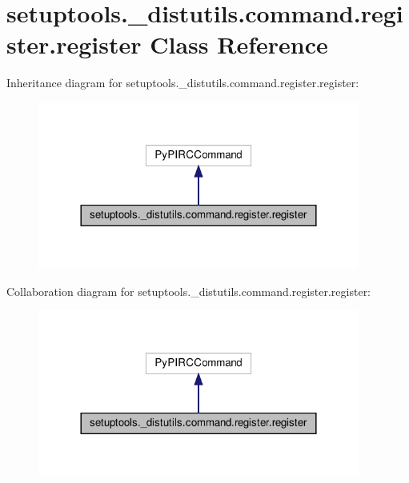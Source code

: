 \hypertarget{classsetuptools_1_1__distutils_1_1command_1_1register_1_1register}{}\section{setuptools.\+\_\+distutils.\+command.\+register.\+register Class Reference}
\label{classsetuptools_1_1__distutils_1_1command_1_1register_1_1register}


Inheritance diagram for setuptools.\+\_\+distutils.\+command.\+register.\+register\+:
\nopagebreak
\begin{figure}[H]
\begin{center}
\leavevmode
\includegraphics[width=300pt]{classsetuptools_1_1__distutils_1_1command_1_1register_1_1register__inherit__graph}
\end{center}
\end{figure}


Collaboration diagram for setuptools.\+\_\+distutils.\+command.\+register.\+register\+:
\nopagebreak
\begin{figure}[H]
\begin{center}
\leavevmode
\includegraphics[width=300pt]{classsetuptools_1_1__distutils_1_1command_1_1register_1_1register__coll__graph}
\end{center}
\end{figure}
